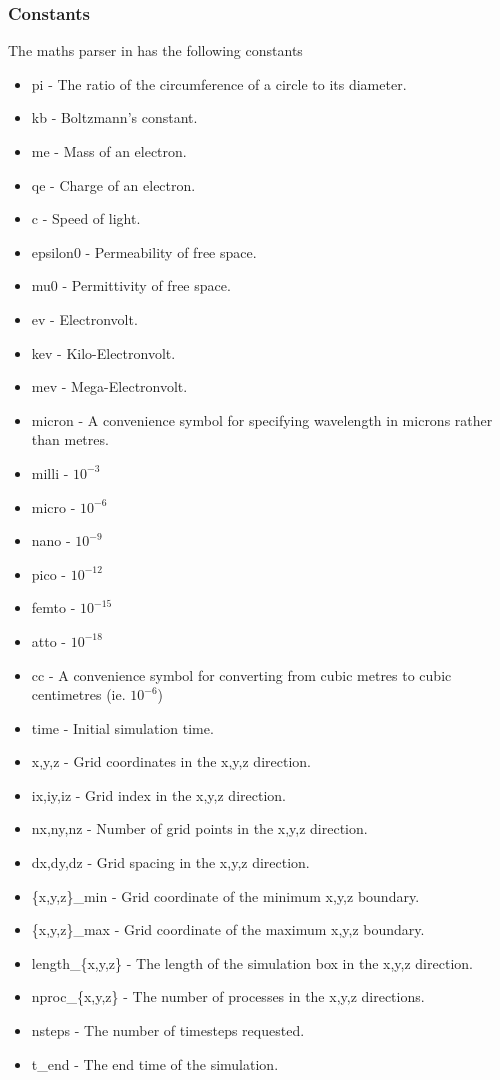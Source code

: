 \subsubsection{Constants}
\label{sec:constants}
The maths parser in {\EPOCH}  has the following constants
\begin{itemize}
\item pi - The ratio of the circumference of a circle to its diameter.
\item kb - Boltzmann's constant.
\item me - Mass of an electron.
\item qe - Charge of an electron.
\item c - Speed of light.
\item epsilon0 - Permeability of free space.
\item mu0 - Permittivity of free space.
\item ev - Electronvolt.
\item kev - Kilo-Electronvolt.
\item mev - Mega-Electronvolt.
\item micron - A convenience symbol for specifying wavelength in microns
  rather than metres.
\item milli - $10^{-3}$
\item micro - $10^{-6}$
\item nano - $10^{-9}$
\item pico - $10^{-12}$
\item femto - $10^{-15}$
\item atto - $10^{-18}$
\item cc - A convenience symbol for converting from cubic metres to cubic
  centimetres (ie. $10^{-6}$)
\item time - Initial simulation time.
\item x,y,z - Grid coordinates in the x,y,z direction.
\item ix,iy,iz - Grid index in the x,y,z direction.
\item nx,ny,nz - Number of grid points in the x,y,z direction.
\item dx,dy,dz - Grid spacing in the x,y,z direction.
\item \{x,y,z\}\_min - Grid coordinate of the minimum x,y,z boundary.
\item \{x,y,z\}\_max - Grid coordinate of the maximum x,y,z boundary.
\item length\_\{x,y,z\} - The length of the simulation box in the x,y,z
  direction.
\item nproc\_\{x,y,z\} - The number of processes in the x,y,z directions.
\item nsteps - The number of timesteps requested.
\item t\_end - The end time of the simulation.
\end{itemize}


